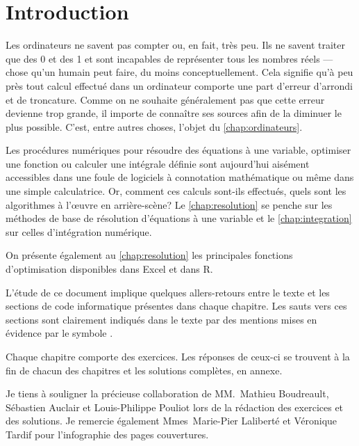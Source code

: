 \chapter*{Introduction}

Les ordinateurs ne savent pas compter ou, en fait, très peu. Ils ne
savent traiter que des 0 et des 1 et sont incapables de représenter
tous les nombres réels --- chose qu'un humain peut faire, du moins
conceptuellement. Cela signifie qu'à peu près tout calcul effectué
dans un ordinateur comporte une part d'erreur d'arrondi et de
troncature. Comme on ne souhaite généralement pas que cette erreur
devienne trop grande, il importe de connaître ses sources afin de la
diminuer le plus possible. C'est, entre autres choses, l'objet du
\autoref{chap:ordinateurs}.

Les procédures numériques pour résoudre des équations à une variable,
optimiser une fonction ou calculer une intégrale définie sont
aujourd'hui aisément accessibles dans une foule de logiciels à
connotation mathématique ou même dans une simple calculatrice. Or,
comment ces calculs sont-ils effectués, quels sont les algorithmes à
l'{\oe}uvre en arrière-scène? Le \autoref{chap:resolution} se
penche sur les méthodes de base de résolution d'équations à une
variable et le \autoref{chap:integration} sur celles
d'intégration numérique.

On présente également au \autoref{chap:resolution} les
principales fonctions d'optimisation disponibles dans Excel et dans R.

L'étude de ce document implique quelques allers-retours entre le texte
et les sections de code informatique présentes dans chaque chapitre.
Les sauts vers ces sections sont clairement indiqués dans le texte par
des mentions mises en évidence par le symbole {\ForwardToEnd}.

Chaque chapitre comporte des exercices. Les réponses de ceux-ci se
trouvent à la fin de chacun des chapitres et les solutions complètes,
en annexe.

Je tiens à souligner la précieuse collaboration de MM.~Mathieu
Boudreault, Sébastien Auclair et Louis-Philippe Pouliot lors de la
rédaction des exercices et des solutions. Je remercie également
Mmes~Marie-Pier Laliberté et Véronique Tardif pour l'infographie des
pages couvertures.

